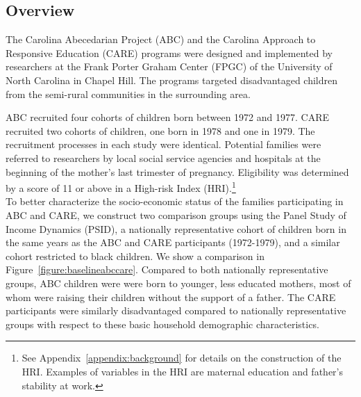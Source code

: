 \subsection{Overview}

\noindent The Carolina Abecedarian Project (ABC) and the Carolina Approach to Responsive Education (CARE) programs were designed and implemented by researchers at the Frank Porter Graham Center (FPGC) of the University of North Carolina in Chapel Hill. The programs targeted disadvantaged children from the semi-rural communities in the surrounding area. 

\noindent ABC recruited four cohorts of children born between 1972 and 1977. CARE recruited two cohorts of children, one born in 1978 and one in 1979. The recruitment processes in each study were identical. Potential families were referred to researchers by local social service agencies and hospitals at the beginning of the mother's last trimester of pregnancy. Eligibility was determined by a score of 11 or above in a High-risk Index (HRI).\footnote{See Appendix~\ref{appendix:background} for details on the construction of the HRI. Examples of variables in the HRI are maternal education and father's stability at work.} \\

\noindent To better characterize the socio-economic status of the families participating in ABC and CARE, we construct two comparison groups using the Panel Study of Income Dynamics (PSID), a nationally representative cohort of children born in the same years as the ABC and CARE participants (1972-1979), and a similar cohort restricted to black children. We show a comparison in Figure~\ref{figure:baselineabccare}. Compared to both nationally representative groups, ABC children were were born to younger, less educated mothers, most of whom were raising their children without the support of a father. The CARE participants were similarly disadvantaged compared to nationally representative groups with respect to these basic household demographic characteristics.\\

